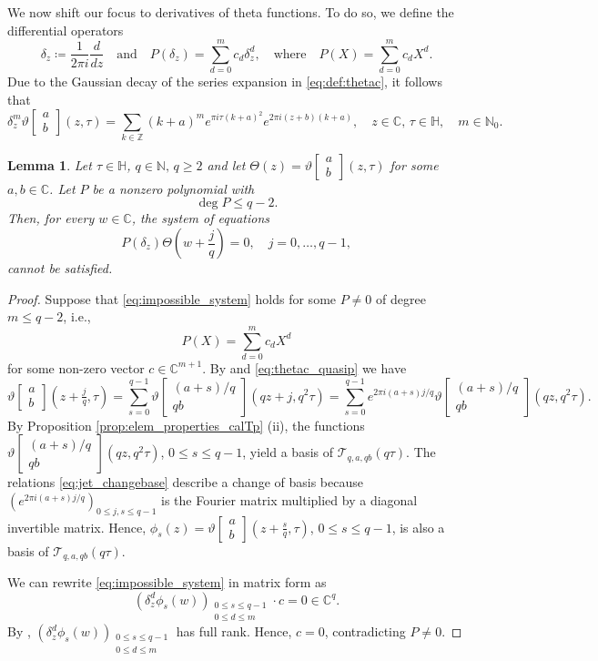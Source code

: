 \documentclass[reqno,a4paper,12pt]{amsart}
\numberwithin{equation}{section}
\newtheorem{lemma}[definition]{Lemma}
\newcommand{\N}{\mathbb N}
\newcommand{\Z}{\mathbb Z}
\newcommand{\C}{\mathbb C}
\newcommand{\HH}{\mathbb H}
\newcommand{\calT}{\mathcal T}
\newcommand{\dd}{\delta}
\newcommand{\thetac}[2]{{\vartheta\left[\begin{smallmatrix}
        #1 \\ #2
    \end{smallmatrix}\right]}}
\begin{document}
We now shift our focus to derivatives of theta functions. To do so, we define the differential operators 
\begin{equation}
    \dd_z\coloneqq\frac{1}{2\pi i}\frac{d}{dz}\quad \text{and}
    \quad 
    P(\dd_z) =  \sum\limits_{d=0}^{m}c_d \dd_z^d, \quad \text{where}\quad P(X) = \sum\limits_{d=0}^{m}c_d X^d.
\end{equation}
Due to the Gaussian decay of the series expansion in \eqref{eq:def:thetac}, it follows that
\begin{equation}\label{eq:delta_theta_ab}
   \delta_z^m\thetac{a}{b}(z,\tau) = 
   \sum\limits_{k\in\Z}(k+a)^me^{\pi i \tau (k+a)^2}e^{2\pi i (z+b) (k+a)},\quad z\in\C,\, \tau\in\HH,\quad m\in\N_0.
\end{equation}

\begin{lemma}\label{lem:torsion-jet}
Let $\tau\in\HH$, $q\in\N, \, q\geq 2$ and let 
$\Theta(z) = \thetac{a}{b}(z,\tau)$ for some $a,b\in\C$.
Let $P$ be a
nonzero polynomial with
$$
\deg P\leq q-2.
$$
Then, for every $w\in\C$, the system of equations
\begin{equation}\label{eq:impossible_system}
    P(\dd_z)\Theta\left(w+\frac{j}{q}\right)=0,
\quad j=0,\dots,q-1,
\end{equation}
cannot be satisfied.
\end{lemma}
\begin{proof} 
Suppose that \eqref{eq:impossible_system} holds for some $P\neq 0$ of degree $m\leq q-2$, i.e., 
$$
P(X)=\sum\limits_{d=0}^{m}c_d X^d
$$
for some non-zero vector $c\in\C^{m+1}$.
By \cite[Lem.~1.4.]{FarkasKra2001} and \eqref{eq:thetac_quasip} we have
\begin{equation}\label{eq:jet_changebase}
    \thetac{a}{b}(z+\tfrac{j}{q},\tau)= \sum_{s=0}^{q-1} \thetac{(a+s)/q}{qb}(qz+j,q^2\tau) = \sum_{s=0}^{q-1} e^{2\pi i (a+s)j/q}\thetac{(a+s)/q}{qb}(qz,q^2\tau).
\end{equation}
By Proposition \ref{prop:elem_properties_calTp} (ii), the functions $\thetac{(a+s)/q}{qb}(qz,q^2\tau)$, $0\leq s\leq q-1$, yield a basis of $\calT_{q,a,qb}(q\tau)$.
The relations \eqref{eq:jet_changebase} describe a change of basis because 
 $\left(e^{2\pi i (a+s)j/q}\right)_{0\leq j,s\leq q-1}$ is the Fourier matrix multiplied by a diagonal invertible matrix.
 Hence, $\phi_s(z)=\thetac{a}{b}(z+\tfrac{s}{q},\tau)$,  $0\leq s\leq q-1$, is also a basis of  $\calT_{q,a,qb}(q\tau)$.

We can rewrite \eqref{eq:impossible_system} in matrix form as 
\begin{equation} \left(\dd_z^d\phi _s(w)\right)_{\substack{0\leq s\leq q-1 \\ 0\leq d\leq m}} \cdot c = 0\in \C^{q}.
\end{equation}
By \cite[Thm.~1]{BauerSzemberg1997},
$\left(\dd_z^d \phi_s(w)\right)_{\substack{0\leq s\leq q-1 \\ 0\leq d\leq m}}$ has full rank. Hence, $c=0$, contradicting $P\neq 0$. 

\end{proof}
\end{document}
